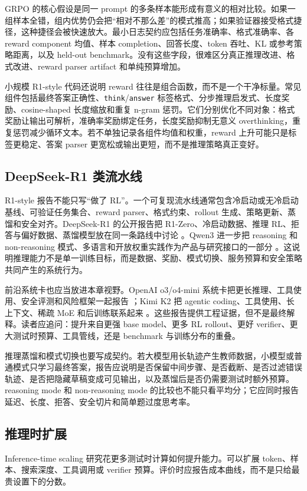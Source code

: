 \documentclass[UTF8,zihao=-4,openany]{ctexbook}
\begin{document}
GRPO 的核心假设是同一 prompt 的多条样本能形成有意义的相对比较。如果一组样本全错，组内优势仍会把“相对不那么差”的模式推高；如果验证器接受格式捷径，这种捷径会被快速放大。最小日志契约应包括任务准确率、格式准确率、各 reward component 均值、样本 completion、回答长度、token 吞吐、KL 或参考策略距离，以及 held-out benchmark。没有这些字段，很难区分真正推理改进、格式改进、reward parser artifact 和单纯预算增加。

小规模 R1-style 代码还说明 reward 往往是组合函数，而不是一个干净标量。常见组件包括最终答案正确性、\texttt{think}/\texttt{answer} 标签格式、分步推理启发式、长度奖励、cosine-shaped 长度缩放和重复 n-gram 惩罚。它们分别优化不同对象：格式奖励让输出可解析，准确率奖励绑定任务，长度奖励抑制无意义 overthinking，重复惩罚减少循环文本。若不单独记录各组件均值和权重，reward 上升可能只是标签更稳定、答案 parser 更宽松或输出更短，而不是推理策略真正变好。

\subsection{DeepSeek-R1 类流水线}
R1-style 报告不能只写“做了 RL”。一个可复现流水线通常包含冷启动或无冷启动基线、可验证任务集合、reward parser、格式约束、rollout 生成、策略更新、蒸馏和安全对齐。DeepSeek-R1 的公开报告把 R1-Zero、冷启动数据、推理 RL、拒答与偏好数据、蒸馏模型放在同一条路线中讨论 \cite{deepseek2025r1}。Qwen3 进一步把 reasoning 和 non-reasoning 模式、多语言和开放权重实践作为产品与研究接口的一部分 \cite{yang2025qwen3}。这说明推理能力不是单一训练目标，而是数据、奖励、模式切换、服务预算和安全策略共同产生的系统行为。

前沿系统卡也应当放进本章视野。OpenAI o3/o4-mini 系统卡把更长推理、工具使用、安全评测和风险框架一起报告 \cite{openai2025o3o4mini}；Kimi K2 把 agentic coding、工具使用、长上下文、稀疏 MoE 和后训练联系起来 \cite{kimi2025k2}。这些报告提供工程证据，但不是最终解释。读者应追问：提升来自更强 base model、更多 RL rollout、更好 verifier、更大测试时预算、工具管线，还是 benchmark 与训练分布的重叠。

推理蒸馏和模式切换也要写成契约。若大模型用长轨迹产生教师数据，小模型或普通模式只学习最终答案，报告应说明是否保留中间步骤、是否截断、是否过滤错误轨迹、是否把隐藏草稿变成可见输出，以及蒸馏后是否仍需要测试时额外预算。reasoning mode 和 non-reasoning mode 的比较也不能只看平均分；它应同时报告延迟、长度、拒答、安全切片和简单题过度思考率。

\subsection{推理时扩展}
Inference-time scaling 研究花更多测试时计算如何提升能力。可以扩展 token、样本、搜索深度、工具调用或 verifier 预算。评价时应报告成本曲线，而不是只给最贵设置下的分数。
\end{document}
